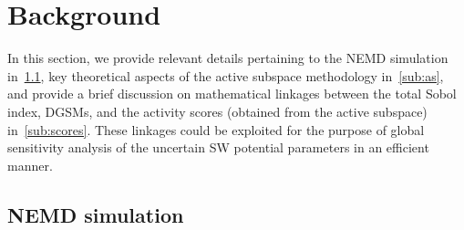\section{Background}
\label{sec:bg}

In this section, we provide relevant details pertaining to the NEMD simulation in~\ref{sub:nemd}, 
key theoretical aspects of the active subspace methodology in~\ref{sub:as}, and provide a 
brief discussion on mathematical linkages between the total Sobol index, DGSMs, and the activity
scores (obtained from the active subspace) in~\ref{sub:scores}. These linkages could be exploited for the purpose of
global sensitivity analysis of the uncertain SW potential parameters in an efficient manner. 

\subsection{NEMD simulation}
\label{sub:nemd}

